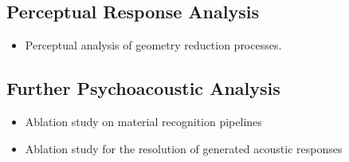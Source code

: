 \subsection{Perceptual Response Analysis}

\begin{itemize}
    \item Perceptual analysis of geometry reduction processes.
\end{itemize}

\subsection{Further Psychoacoustic Analysis}

\begin{itemize}
    \item Ablation study on material recognition pipelines
    \item Ablation study for the resolution of generated acoustic responses
\end{itemize}
